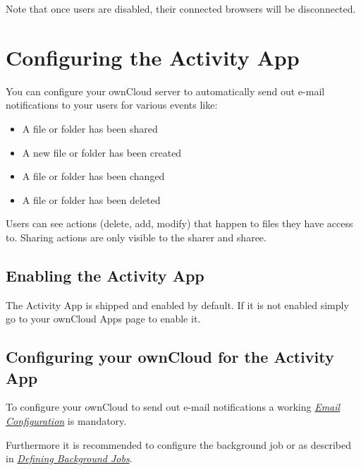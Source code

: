 \documentclass[letterpaper,10pt,english]{sphinxmanual}
\begin{document}
Note that once users are disabled, their connected browsers will be disconnected.


\section{Configuring the Activity App}
\label{configuration_server/activity_configuration::doc}\label{configuration_server/activity_configuration:configuring-the-activity-app}
You can configure your ownCloud server to automatically send out e-mail notifications
to your users for various events like:
\begin{itemize}
\item {} 
A file or folder has been shared

\item {} 
A new file or folder has been created

\item {} 
A file or folder has been changed

\item {} 
A file or folder has been deleted

\end{itemize}

Users can see actions (delete, add, modify) that happen to files they have access to.
Sharing actions are only visible to the sharer and sharee.


\subsection{Enabling the Activity App}
\label{configuration_server/activity_configuration:enabling-the-activity-app}
The Activity App is shipped and enabled by default. If it is not enabled
simply go to your ownCloud Apps page to enable it.


\subsection{Configuring your ownCloud for the Activity App}
\label{configuration_server/activity_configuration:configuring-your-owncloud-for-the-activity-app}
To configure your ownCloud to send out e-mail notifications a working
{\hyperref[configuration_server/email_configuration::doc]{\emph{Email Configuration}}} is mandatory.

Furthermore it is recommended to configure the background job  or
 as described in {\hyperref[configuration_server/background_jobs_configuration::doc]{\emph{Defining Background Jobs}}}.
\end{document}
